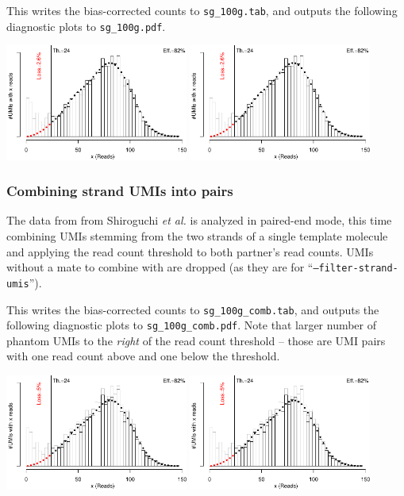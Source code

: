 \documentclass[10pt]{article}
\begin{document}

This writes the bias-corrected counts to \texttt{sg\_100g.tab}, and outputs the following diagnostic plots to \texttt{sg\_100g.pdf}.

{\centering \includegraphics[width=6cm,page=1]{../examples/sg_100g.pdf}
            \includegraphics[width=6cm,page=2]{../examples/sg_100g.pdf}\\}

\subsubsection*{Combining strand UMIs into pairs}

The data from from Shiroguchi \textit{et al.} is analyzed in paired-end mode, this time combining UMIs stemming from the two strands of a single template molecule and applying the read count threshold to both partner's read counts. UMIs without a mate to combine with are dropped (as they are for ``\texttt{--filter-strand-umis}'').


This writes the bias-corrected counts to \texttt{sg\_100g\_comb.tab}, and outputs the following diagnostic plots to \texttt{sg\_100g\_comb.pdf}. Note that larger number of phantom UMIs to the \emph{right} of the read count threshold -- those are UMI pairs with one read count above and one below the threshold.

{\centering \includegraphics[width=6cm,page=1]{../examples/sg_100g_comb.pdf}
            \includegraphics[width=6cm,page=2]{../examples/sg_100g_comb.pdf}\\}
\end{document}
